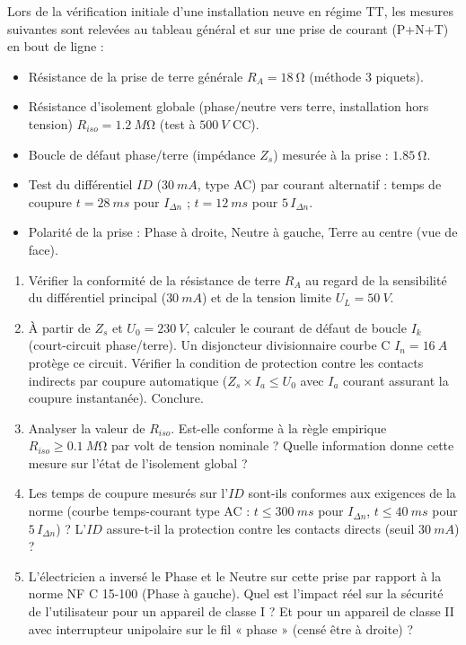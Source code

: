 \documentclass[11pt]{article}
\begin{document}
\begin{exercice}
Lors de la vérification initiale d'une installation neuve en régime TT, les mesures suivantes sont relevées au tableau général et sur une prise de courant (P+N+T) en bout de ligne :
\begin{itemize}
    \item Résistance de la prise de terre générale $R_A = \SI{18}{\ohm}$ (méthode 3 piquets).
    \item Résistance d'isolement globale (phase/neutre vers terre, installation hors tension) $R_{iso} = \SI{1,2}{M\ohm}$ (test à $\SI{500}{V}$ CC).
    \item Boucle de défaut phase/terre (impédance $Z_s$) mesurée à la prise : $\SI{1,85}{\ohm}$.
    \item Test du différentiel $ID$ ($\SI{30}{mA}$, type AC) par courant alternatif : temps de coupure $t = \SI{28}{ms}$ pour $I_{\Delta n}$ ; $t = \SI{12}{ms}$ pour $5\,I_{\Delta n}$.
    \item Polarité de la prise : Phase à droite, Neutre à gauche, Terre au centre (vue de face).
\end{itemize}
\begin{enumerate}
    \item Vérifier la conformité de la résistance de terre $R_A$ au regard de la sensibilité du différentiel principal ($\SI{30}{mA}$) et de la tension limite $U_L=\SI{50}{V}$.
    \item À partir de $Z_s$ et $U_0=\SI{230}{V}$, calculer le courant de défaut de boucle $I_k$ (court-circuit phase/terre). Un disjoncteur divisionnaire courbe C $I_n=\SI{16}{A}$ protège ce circuit. Vérifier la condition de protection contre les contacts indirects par coupure automatique ($Z_s \times I_a \le U_0$ avec $I_a$ courant assurant la coupure instantanée). Conclure.
    \item Analyser la valeur de $R_{iso}$. Est-elle conforme à la règle empirique $R_{iso} \ge \SI{0,1}{M\ohm}$ par volt de tension nominale ? Quelle information donne cette mesure sur l'état de l'isolement global ?
    \item Les temps de coupure mesurés sur l'$ID$ sont-ils conformes aux exigences de la norme (courbe temps-courant type AC : $t \le \SI{300}{ms}$ pour $I_{\Delta n}$, $t \le \SI{40}{ms}$ pour $5\,I_{\Delta n}$) ? L'$ID$ assure-t-il la protection contre les contacts directs (seuil $\SI{30}{mA}$) ?
    \item L'électricien a inversé le Phase et le Neutre sur cette prise par rapport à la norme NF C 15-100 (Phase à gauche). Quel est l'impact réel sur la sécurité de l'utilisateur pour un appareil de classe I ? Et pour un appareil de classe II avec interrupteur unipolaire sur le fil « phase » (censé être à droite) ?
\end{enumerate}
\end{exercice}
\end{document}
